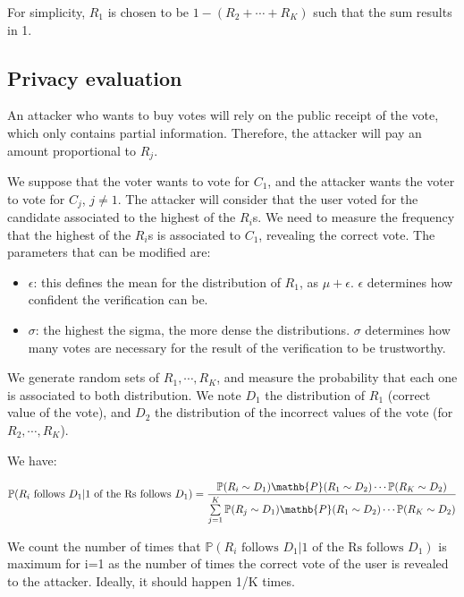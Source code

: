 \documentclass{article}
\begin{document}
For simplicity, $R_1$ is chosen to be $1-(R_2+\cdots+R_K)$ such that the sum results in 1.


\subsection{Privacy evaluation}

An attacker who wants to buy votes will rely on the public receipt of the vote, which only contains partial information. Therefore, the attacker will pay an amount proportional to $R_j$.

We suppose that the voter wants to vote for $C_1$, and the attacker wants the voter to vote for $C_j$, $j\neq 1$. The attacker will consider that the user voted for the candidate associated to the highest of the $R_i$s. We need to measure the frequency that the highest of the $R_i$s is associated to $C_1$, revealing the correct vote. The parameters that can be modified are:
\begin{itemize}
    \item $\epsilon$: this defines the mean for the distribution of $R_1$, as $\mu + \epsilon$. $\epsilon$ determines how confident the verification can be.
    \item $\sigma$: the highest the sigma, the more dense the distributions. $\sigma$ determines how many votes are necessary for the result of the verification to be trustworthy.
\end{itemize}

We generate random sets of $R_1, \cdots, R_K$, and measure the probability that each one is associated to both distribution. We note $D_1$ the distribution of $R_1$ (correct value of the vote), and $D_2$ the distribution of the incorrect values of the vote (for $R_2, \cdots, R_K$).

We have:

$\mathbb{P}(R_i\text{ follows }D_1 | \text{1 of the Rs follows }D_1)=\dfrac{\mathbb{P}(R_i\sim D_1)\mathb{P}(R_1 \sim D_2)\cdots \mathbb{P}(R_K \sim D_2)}{\sum\limits_{j=1}^{K}\mathbb{P}(R_j\sim D_1)\mathb{P}(R_1 \sim D_2)\cdots \mathbb{P}(R_K \sim D_2)}$

We count the number of times that $\mathbb{P}(R_i\text{ follows }D_1 | \text{1 of the Rs follows }D_1)$ is maximum for i=1 as the number of times the correct vote of the user is revealed to the attacker. Ideally, it should happen 1/K times.
\end{document}
